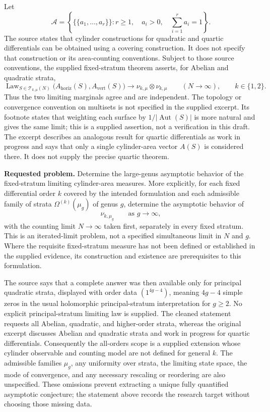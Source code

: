 \documentclass[11pt]{article}
\begin{document}
Let
\[
 \mathscr A=\left\{\{\!\{a_1,\ldots,a_r\}\!\}:
 r\geq1,\quad a_i>0,\quad \sum_{i=1}^r a_i=1\right\}.
\]
The source states that cylinder constructions for quadratic and quartic differentials can be obtained using a covering construction. It does not specify that construction or its area-counting conventions. Subject to those source conventions, the supplied fixed-stratum theorem asserts, for Abelian and quadratic strata,
\[
 \operatorname{Law}_{S\in\mathcal T_{k,\mu}(N)}
 \bigl(A_{\mathrm{horiz}}(S),A_{\mathrm{vert}}(S)\bigr)
 \longrightarrow \nu_{k,\mu}\otimes\nu_{k,\mu}
 \qquad (N\to\infty),\qquad k\in\{1,2\}.
\]
Thus the two limiting marginals agree and are independent. The topology or convergence convention on multisets is not specified in the supplied excerpt. Its footnote states that weighting each surface by \(1/|\operatorname{Aut}(S)|\) is more natural and gives the same limit; this is a supplied assertion, not a verification in this draft. The excerpt describes an analogous result for quartic differentials as work in progress and says that only a single cylinder-area vector \(A(S)\) is considered there. It does not supply the precise quartic theorem.

\textbf{Requested problem.} Determine the large-genus asymptotic behavior of the fixed-stratum limiting cylinder-area measures. More explicitly, for each fixed differential order \(k\) covered by the intended formulation and each admissible family of strata \(\Omega^{(k)}(\mu_g)\) of genus \(g\), determine the asymptotic behavior of
\[
 \nu_{k,\mu_g}\qquad\text{as }g\to\infty,
\]
with the counting limit \(N\to\infty\) taken first, separately in every fixed stratum. This is an iterated-limit problem, not a specified simultaneous limit in \(N\) and \(g\). Where the requisite fixed-stratum measure has not been defined or established in the supplied evidence, its construction and existence are prerequisites to this formulation.

The source says that a complete answer was then available only for principal quadratic strata, displayed with order data \((1^{4g-4})\), meaning \(4g-4\) simple zeros in the usual holomorphic principal-stratum interpretation for \(g\geq2\). No explicit principal-stratum limiting law is supplied. The cleaned statement requests all Abelian, quadratic, and higher-order strata, whereas the original excerpt discusses Abelian and quadratic strata and work in progress for quartic differentials. Consequently the all-orders scope is a supplied extension whose cylinder observable and counting model are not defined for general \(k\). The admissible families \(\mu_g\), any uniformity over strata, the limiting state space, the mode of convergence, and any necessary rescaling or reordering are also unspecified. These omissions prevent extracting a unique fully quantified asymptotic conjecture; the statement above records the research target without choosing those missing data.
\end{document}
